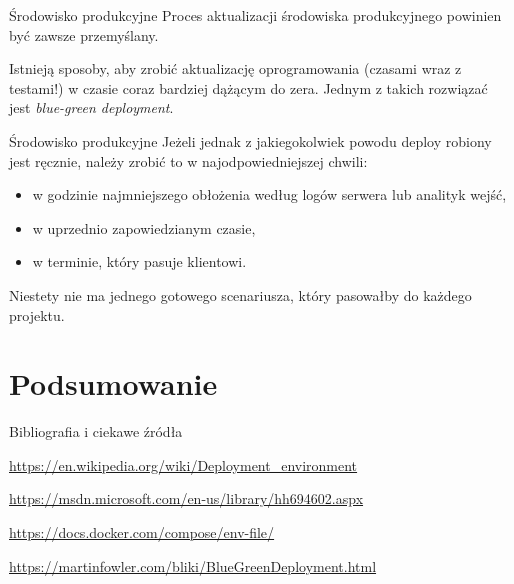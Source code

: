 \begin{frame}{Środowisko produkcyjne}
	Proces aktualizacji środowiska produkcyjnego powinien być zawsze przemyślany.
	
	Istnieją sposoby, aby zrobić aktualizację oprogramowania (czasami wraz z testami!) w czasie coraz bardziej dążącym do zera. Jednym z takich rozwiązać jest \emph{blue-green deployment}.
\end{frame}

\begin{frame}{Środowisko produkcyjne}
	Jeżeli jednak z jakiegokolwiek powodu deploy robiony jest ręcznie, należy zrobić to w najodpowiedniejszej chwili:
	\begin{itemize}
		\item w godzinie najmniejszego obłożenia według logów serwera lub analityk wejść,
		\item w uprzednio zapowiedzianym czasie,
		\item w terminie, który pasuje klientowi.
	\end{itemize}
	
	Niestety nie ma jednego gotowego scenariusza, który pasowałby do każdego projektu.
\end{frame}

\section{Podsumowanie}

\begin{frame}{Bibliografia i ciekawe źródła}
  
	\begin{thebibliography}{9}
		
		\url{https://en.wikipedia.org/wiki/Deployment_environment}
	
		\url{https://msdn.microsoft.com/en-us/library/hh694602.aspx}
		
		\url{https://docs.docker.com/compose/env-file/}
		
		\url{https://martinfowler.com/bliki/BlueGreenDeployment.html}
		
	\end{thebibliography}

\end{frame}

